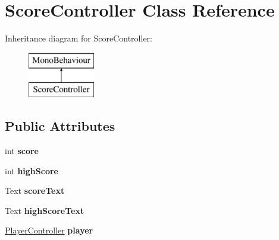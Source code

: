 \hypertarget{class_score_controller}{}\section{Score\+Controller Class Reference}
\label{class_score_controller}
Inheritance diagram for Score\+Controller\+:\begin{figure}[H]
\begin{center}
\leavevmode
\includegraphics[height=2.000000cm]{class_score_controller}
\end{center}
\end{figure}
\subsection*{Public Attributes}
\begin{DoxyCompactItemize}
\item 
\hypertarget{class_score_controller_a1be2da4c8951c565e55406e546d48651}{}\label{class_score_controller_a1be2da4c8951c565e55406e546d48651} 
int {\bfseries score}
\item 
\hypertarget{class_score_controller_af25aeff6d92cb0bfe9d0c6bbed6b450b}{}\label{class_score_controller_af25aeff6d92cb0bfe9d0c6bbed6b450b} 
int {\bfseries high\+Score}
\item 
\hypertarget{class_score_controller_a7152e2b1715326c8a1ab07c6b3d1ca4b}{}\label{class_score_controller_a7152e2b1715326c8a1ab07c6b3d1ca4b} 
Text {\bfseries score\+Text}
\item 
\hypertarget{class_score_controller_a2ab288a8f264ce21418e90ed8f175f00}{}\label{class_score_controller_a2ab288a8f264ce21418e90ed8f175f00} 
Text {\bfseries high\+Score\+Text}
\item 
\hypertarget{class_score_controller_a396f8b7a21830617b640e67e4e9a14e7}{}\label{class_score_controller_a396f8b7a21830617b640e67e4e9a14e7} 
\hyperlink{class_player_controller}{Player\+Controller} {\bfseries player}
\end{DoxyCompactItemize}
